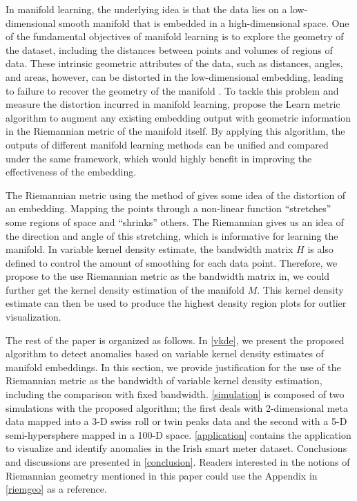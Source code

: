 \documentclass[11pt,a4paper,]{article}
\begin{document}
In manifold learning, the underlying idea is that the data lies on a low-dimensional smooth manifold that is embedded in a high-dimensional space. One of the fundamental objectives of manifold learning is to explore the geometry of the dataset, including the distances between points and volumes of regions of data. These intrinsic geometric attributes of the data, such as distances, angles, and areas, however, can be distorted in the low-dimensional embedding, leading to failure to recover the geometry of the manifold \autocite{Goldberg2008-co}. To tackle this problem and measure the distortion incurred in manifold learning,
\textcite{Perrault-Joncas2013-pq} propose the Learn metric algorithm to augment any existing embedding output with geometric information in the Riemannian metric of the manifold itself. By applying this algorithm, the outputs of different manifold learning methods can be unified and compared under the same framework, which would highly benefit in improving the effectiveness of the embedding.

The Riemannian metric using the method of \textcite{Perrault-Joncas2013-pq} gives some idea of the distortion of an embedding. Mapping the points through a non-linear function ``stretches'' some regions of space and ``shrinks'' others. The Riemannian gives us an idea of the direction and angle of this stretching, which is informative for learning the manifold. In variable kernel density estimate, the bandwidth matrix \(H\) is also defined to control the amount of smoothing for each data point.
Therefore, we propose to the use Riemannian metric as the bandwidth matrix in, we could further get the kernel density estimation of the manifold \(M\). This kernel density estimate can then be used to produce the highest density region plots\autocite{Hyndman1996-lk} for outlier visualization.

The rest of the paper is organized as follows. In \autoref{vkde}, we present the proposed algorithm to detect anomalies based on variable kernel density estimates of manifold embeddings. In this section, we provide justification for the use of the Riemannian metric as the bandwidth of variable kernel density estimation, including the comparison with fixed bandwidth. \autoref{simulation} is composed of two simulations with the proposed algorithm; the first deals with 2-dimensional meta data mapped into a 3-D swiss roll or twin peaks data and the second with a 5-D semi-hypersphere mapped in a 100-D space.
\autoref{application} contains the application to visualize and identify anomalies in the Irish smart meter dataset. Conclusions and discussions are presented in \autoref{conclusion}. Readers interested in the notions of Riemannian geometry mentioned in this paper could use the Appendix in \autoref{riemgeo} as a reference.
\end{document}
